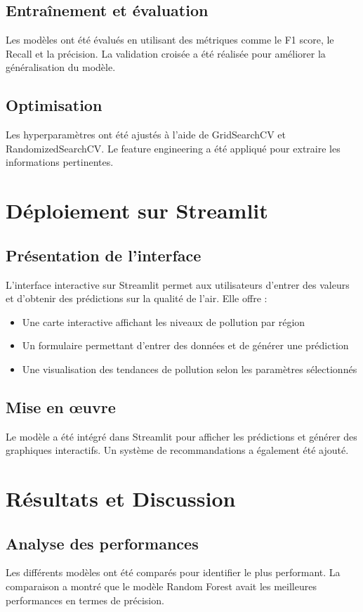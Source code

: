 \documentclass[12pt]{article}
\begin{document}
\subsection{Entraînement et évaluation}
Les modèles ont été évalués en utilisant des métriques comme le F1 score, le Recall et la précision. La validation croisée a été réalisée pour améliorer la généralisation du modèle.

\subsection{Optimisation}
Les hyperparamètres ont été ajustés à l'aide de GridSearchCV et RandomizedSearchCV. Le feature engineering a été appliqué pour extraire les informations pertinentes.

\section{Déploiement sur Streamlit}
\subsection{Présentation de l'interface}
L'interface interactive sur Streamlit permet aux utilisateurs d'entrer des valeurs et d'obtenir des prédictions sur la qualité de l'air. Elle offre :
\begin{itemize}
    \item Une carte interactive affichant les niveaux de pollution par région
    \item Un formulaire permettant d'entrer des données et de générer une prédiction
    \item Une visualisation des tendances de pollution selon les paramètres sélectionnés
\end{itemize}

\subsection{Mise en œuvre}
Le modèle a été intégré dans Streamlit pour afficher les prédictions et générer des graphiques interactifs. Un système de recommandations a également été ajouté.

\section{Résultats et Discussion}
\subsection{Analyse des performances}
Les différents modèles ont été comparés pour identifier le plus performant. La comparaison a montré que le modèle Random Forest avait les meilleures performances en termes de précision.
\end{document}

